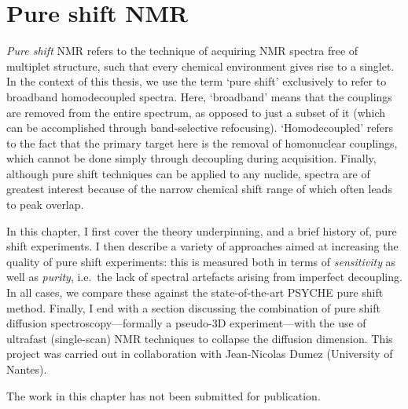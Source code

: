 \chapter{Pure shift NMR}
\label{chpt:pureshift}

\textit{Pure shift} NMR refers to the technique of acquiring NMR spectra free of multiplet structure, such that every chemical environment gives rise to a singlet.\autocite{Zangger2015PNMRS,Castanar2017MRC}
In the context of this thesis, we use the term `pure shift' exclusively to refer to broadband homodecoupled \proton{} spectra.
Here, `broadband' means that the couplings are removed from the entire spectrum, as opposed to just a subset of it (which can be accomplished through band-selective refocusing).
`Homodecoupled' refers to the fact that the primary target here is the removal of homonuclear couplings, which cannot be done simply through decoupling during acquisition.
Finally, although pure shift techniques can be applied to any nuclide, \proton{} spectra are of greatest interest because of the narrow chemical shift range of \proton{} which often leads to peak overlap.

In this chapter, I first cover the theory underpinning, and a brief history of, pure shift experiments.
I then describe a variety of approaches aimed at increasing the quality of pure shift experiments: this is measured both in terms of \textit{sensitivity} as well as \textit{purity}, i.e.\ the lack of spectral artefacts arising from imperfect decoupling.
In all cases, we compare these against the state-of-the-art PSYCHE pure shift method\autocite{Foroozandeh2014ACIE,Foroozandeh2018CEJ}.
Finally, I end with a section discussing the combination of pure shift diffusion spectroscopy---formally a pseudo-3D experiment---with the use of ultrafast (single-scan) NMR techniques to collapse the diffusion dimension.
This project was carried out in collaboration with Jean-Nicolas Dumez (University of Nantes).

The work in this chapter has not been submitted for publication.








\printbibliography[heading=subbibnumbered]{}
